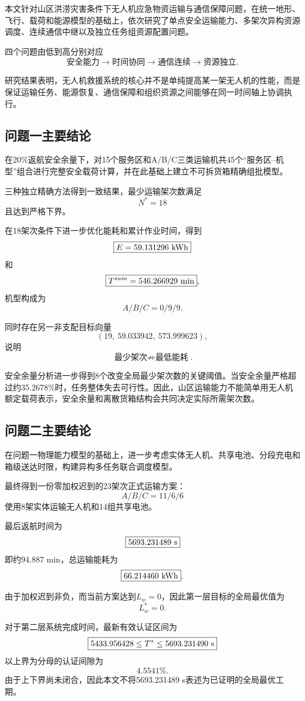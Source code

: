 \documentclass[UTF8,a4paper,12pt]{ctexart}
\begin{document}
本文针对山区洪涝灾害条件下无人机应急物资运输与通信保障问题，在统一地形、飞行、载荷和能源模型的基础上，依次研究了单点安全运输能力、多架次异构资源调度、连续通信中继以及独立任务组资源配置问题。

四个问题由低到高分别对应
\[
\boxed{
\text{安全能力}
\rightarrow
\text{时间协同}
\rightarrow
\text{通信连续}
\rightarrow
\text{资源独立}
}.
\]

研究结果表明，无人机救援系统的核心并不是单纯提高某一架无人机的性能，而是保证运输任务、能源恢复、通信保障和组织资源之间能够在同一时间轴上协调执行。

\subsection{问题一主要结论}

在20\%返航安全余量下，对15个服务区和A/B/C三类运输机共45个“服务区--机型”组合进行完整安全载荷计算，并在此基础上建立不可拆货箱精确组批模型。

三种独立精确方法得到一致结果，最少运输架次数满足
\[
\boxed{N^*=18}
\]
且达到严格下界。

在18架次条件下进一步优化能耗和累计作业时间，得到
\[
\boxed{E=59.131296\ {\rm kWh}}
\]
和
\[
\boxed{T^{sum}=546.266929\ {\rm min}},
\]
机型构成为
\[
A/B/C=0/9/9.
\]

同时存在另一非支配目标向量
\[
(19,\ 59.033942,\ 573.999623),
\]
说明
\[
\boxed{
\text{最少架次}
\not\Rightarrow
\text{最低能耗}
}.
\]

安全余量分析进一步得到8个改变全局最少架次数的关键阈值。当安全余量严格超过约35.2678\%时，任务整体失去可行性。因此，山区运输能力不能简单用无人机额定载荷表示，安全余量和离散货箱结构会共同决定实际所需架次数。

\subsection{问题二主要结论}

在问题一物理能力模型的基础上，进一步考虑实体无人机、共享电池、分段充电和箱级送达时限，构建异构多任务联合调度模型。

最终得到一份零加权迟到的23架次正式运输方案：
\[
\boxed{A/B/C=11/6/6}
\]
使用8架实体运输无人机和14组共享电池。

最后返航时间为
\[
\boxed{5693.231489\ {\rm s}}
\]
即约94.887 min，总运输能耗为
\[
\boxed{66.214460\ {\rm kWh}}.
\]

由于加权迟到非负，而当前方案达到$L_w=0$，因此第一层目标的全局最优值为
\[
\boxed{L_w^*=0}.
\]

对于第二层系统完成时间，最新有效认证区间为
\[
\boxed{
5433.956428
\le
T^*
\le
5693.231490\ {\rm s}
}
\]
以上界为分母的认证间隙为
\[
\boxed{4.5541\%}.
\]
由于上下界尚未闭合，因此本文不将5693.231489 s表述为已证明的全局最优工期。
\end{document}
